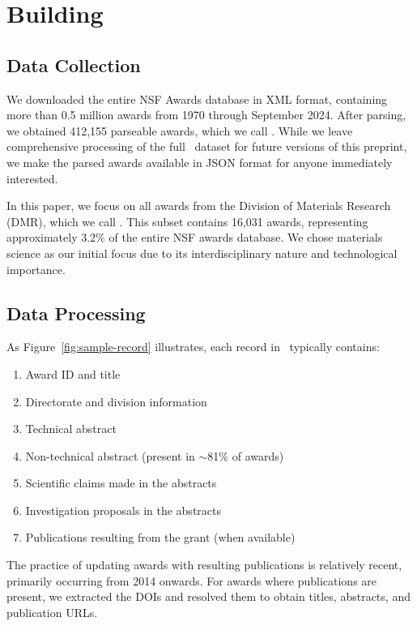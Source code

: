 \documentclass[11pt]{article}
\begin{document}
\section{Building \DatasetName}

\subsection{Data Collection}
We downloaded the entire NSF Awards database in XML format, containing more than 0.5 million awards from 1970 through September 2024. After parsing, we obtained 412,155 parseable awards, which we call \DatasetName. While we leave comprehensive processing of the full \DatasetName~dataset for future versions of this preprint, we make the parsed awards available in JSON format for anyone immediately interested.

In this paper, we focus on all awards from the Division of Materials Research (DMR), which we call \DatasetNameMatSci. This subset contains 16,031 awards, representing approximately 3.2\% of the entire NSF awards database. We chose materials science as our initial focus due to its interdisciplinary nature and technological importance.

\subsection{Data Processing}

As Figure~\ref{fig:sample-record} illustrates, each record in  \DatasetNameMatSci~typically contains:
\begin{enumerate}[noitemsep,topsep=0pt]
\item Award ID and title
\item Directorate and division information
\item Technical abstract
\item Non-technical abstract (present in $\sim$81\% of awards)
\item Scientific claims made in the abstracts
\item Investigation proposals in the abstracts
\item Publications resulting from the grant (when available)
\end{enumerate}

The practice of updating awards with resulting publications is relatively recent, primarily occurring from 2014 onwards. For awards where publications are present, we extracted the DOIs and resolved them to obtain titles, abstracts, and publication URLs.
\end{document}
